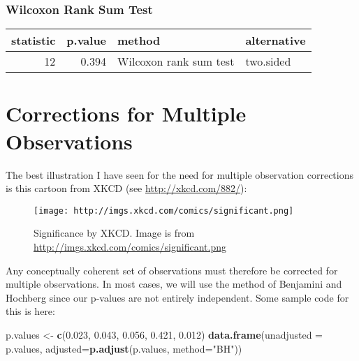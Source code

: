 \documentclass[]{article}
\newenvironment{Shaded}{\begin{snugshade}}{\end{snugshade}}
\newcommand{\KeywordTok}[1]{\textcolor[rgb]{0.13,0.29,0.53}{\textbf{{#1}}}}
\newcommand{\DataTypeTok}[1]{\textcolor[rgb]{0.13,0.29,0.53}{{#1}}}
\newcommand{\FloatTok}[1]{\textcolor[rgb]{0.00,0.00,0.81}{{#1}}}
\newcommand{\StringTok}[1]{\textcolor[rgb]{0.31,0.60,0.02}{{#1}}}
\newcommand{\CommentTok}[1]{\textcolor[rgb]{0.56,0.35,0.01}{\textit{{#1}}}}
\newcommand{\NormalTok}[1]{{#1}}
\begin{document}
\subsubsection{Wilcoxon Rank Sum Test}\label{wilcoxon-rank-sum-test}

\begin{Shaded}
\end{Shaded}

\begin{longtable}[]{@{}rrll@{}}
\toprule
statistic & p.value & method & alternative\tabularnewline
\midrule
\endhead
12 & 0.394 & Wilcoxon rank sum test & two.sided\tabularnewline
\bottomrule
\end{longtable}

\section{Corrections for Multiple
Observations}\label{corrections-for-multiple-observations}

The best illustration I have seen for the need for multiple observation
corrections is this cartoon from XKCD (see \url{http://xkcd.com/882/}):

\begin{figure}[htbp]
\centering
\texttt{[image: http://imgs.xkcd.com/comics/significant.png]}
\caption{Significance by XKCD. Image is from
\url{http://imgs.xkcd.com/comics/significant.png}}
\end{figure}

Any conceptually coherent set of observations must therefore be
corrected for multiple observations. In most cases, we will use the
method of Benjamini and Hochberg since our p-values are not entirely
independent. Some sample code for this is here:

\begin{Shaded}
\begin{Highlighting}[]
\NormalTok{p.values <-}\StringTok{ }\KeywordTok{c}\NormalTok{(}\FloatTok{0.023}\NormalTok{, }\FloatTok{0.043}\NormalTok{, }\FloatTok{0.056}\NormalTok{, }\FloatTok{0.421}\NormalTok{, }\FloatTok{0.012}\NormalTok{)}
\KeywordTok{data.frame}\NormalTok{(}\DataTypeTok{unadjusted =} \NormalTok{p.values, }\DataTypeTok{adjusted=}\KeywordTok{p.adjust}\NormalTok{(p.values, }\DataTypeTok{method=}\StringTok{"BH"}\NormalTok{))}
\end{Highlighting}
\end{Shaded}
\end{document}

